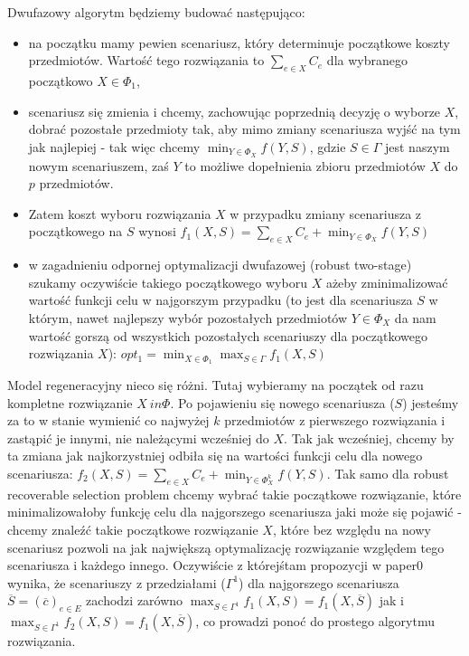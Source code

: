 Dwufazowy algorytm będziemy budować następująco:
\begin{itemize}
	\item na początku mamy pewien scenariusz, który determinuje początkowe koszty przedmiotów. Wartość tego rozwiązania to $\sum_{e \in X} C_{e}$ dla wybranego początkowo $X \in \Phi_{1}$,
	\item scenariusz się zmienia i chcemy, zachowując poprzednią decyzję o wyborze $X$, dobrać pozostałe przedmioty tak, aby mimo zmiany scenariusza wyjść na tym jak najlepiej - tak więc chcemy $\min_{Y \in \Phi_{X}} f \left( Y, S \right)$, gdzie $S \in \Gamma$ jest naszym nowym scenariuszem, zaś $Y$ to możliwe dopełnienia zbioru przedmiotów $X$ do $p$ przedmiotów.
	\item Zatem koszt wyboru rozwiązania $X$ w przypadku zmiany scenariusza z początkowego na $S$ wynosi $f_{1} \left( X, S \right) = \sum_{e \in X} C_{e} + \min_{Y \in \Phi_{X}} f \left( Y, S \right)$
	\item w zagadnieniu odpornej optymalizacji dwufazowej (robust two-stage) szukamy oczywiście takiego początkowego wyboru $X$ ażeby zminimalizować wartość funkcji celu w najgorszym przypadku (to jest dla scenariusza $S$ w którym, nawet najlepszy wybór pozostałych przedmiotów $Y \in \Phi_{X}$ da nam wartość gorszą od wszystkich pozostałych scenariuszy dla początkowego rozwiązania $X$): $opt_{1} = \min_{X \in \Phi_{1}} \max_{S \in \Gamma} f_{1} \left( X, S \right)$
\end{itemize}

Model regeneracyjny nieco się różni. Tutaj wybieramy na początek od razu kompletne rozwiązanie $X \ in \Phi$. Po pojawieniu się nowego scenariusza ($S$) jesteśmy za to w stanie wymienić co najwyżej $k$ przedmiotów z pierwszego rozwiązania i zastąpić je innymi, nie należącymi wcześniej do $X$. Tak jak wcześniej, chcemy by ta zmiana jak najkorzystniej odbiła się na wartości funkcji celu dla nowego scenariusza: $f_{2} \left( X, S \right) = \sum_{e \in X} C_{e} + \min_{Y \in \Phi_{X}^{k}} f \left( Y, S \right)$. Tak samo dla robust recoverable selection problem chcemy wybrać takie początkowe rozwiązanie, które minimalizowałoby funkcję celu dla najgorszego scenariusza jaki może się pojawić - chcemy znaleźć takie początkowe rozwiązanie $X$, które bez względu na nowy scenariusz pozwoli na jak największą optymalizację rozwiązanie względem tego scenariusza i każdego innego. Oczywiście z którejśtam propozycji w paper0 wynika, że scenariuszy z przedziałami ($\Gamma^{1}$) dla najgorszego scenariusza $\overline{S} = \left( \overline{c} \right)_{e \in E}$ zachodzi zarówno $\max_{S \in \Gamma^{1}} f_{1} \left( X, S \right) = f_{1} \left( X, \overline{S} \right)$ jak i $\max_{S \in \Gamma^{1}} f_{2} \left( X, S \right) = f_{1} \left( X, \overline{S} \right)$, co prowadzi ponoć do prostego algorytmu rozwiązania.


